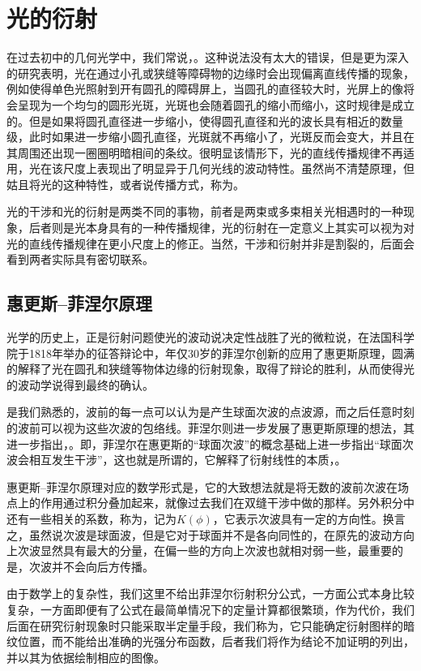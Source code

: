 \section{光的衍射}
在过去初中的几何光学中，我们常说，。这种说法没有太大的错误，但是更为深入的研究表明，光在通过小孔或狭缝等障碍物的边缘时会出现偏离直线传播的现象，例如使得单色光照射到开有圆孔的障碍屏上，当圆孔的直径较大时，光屏上的像将会呈现为一个均匀的圆形光斑，光斑也会随着圆孔的缩小而缩小，这时规律是成立的。但是如果将圆孔直径进一步缩小，使得圆孔直径和光的波长具有相近的数量级，此时如果进一步缩小圆孔直径，光斑就不再缩小了，光斑反而会变大，并且在其周围还出现一圈圈明暗相间的条纹。很明显该情形下，光的直线传播规律不再适用，光在该尺度上表现出了明显异于几何光线的波动特性。虽然尚不清楚原理，但姑且将光的这种特性，或者说传播方式，称为。

光的干涉和光的衍射是两类不同的事物，前者是两束或多束相关光相遇时的一种现象，后者则是光本身具有的一种传播规律，光的衍射在一定意义上其实可以视为对光的直线传播规律在更小尺度上的修正。当然，干涉和衍射并非是割裂的，后面会看到两者实际具有密切联系。

\subsection{惠更斯--菲涅尔原理}
光学的历史上，正是衍射问题使光的波动说决定性战胜了光的微粒说，在法国科学院于1818年举办的征答辩论中，年仅30岁的菲涅尔创新的应用了惠更斯原理，圆满的解释了光在圆孔和狭缝等物体边缘的衍射现象，取得了辩论的胜利，从而使得光的波动学说得到最终的确认。

是我们熟悉的，波前的每一点可以认为是产生球面次波的点波源，而之后任意时刻的波前可以视为这些次波的包络线。菲涅尔则进一步发展了惠更斯原理的想法，其进一步指出，。即，菲涅尔在惠更斯的“球面次波”的概念基础上进一步指出“球面次波会相互发生干涉”，这也就是所谓的，它解释了衍射线性的本质，。

惠更斯--菲涅尔原理对应的数学形式是，它的大致想法就是将无数的波前次波在场点上的作用通过积分叠加起来，就像过去我们在双缝干涉中做的那样。另外积分中还有一些相关的系数，称为，记为$K(\phi)$，它表示次波具有一定的方向性。换言之，虽然说次波是球面波，但是它对于球面并不是各向同性的，在原先的波动方向上次波显然具有最大的分量，在偏一些的方向上次波也就相对弱一些，最重要的是，次波并不会向后方传播。

由于数学上的复杂性，我们这里不给出菲涅尔衍射积分公式，一方面公式本身比较复杂，一方面即便有了公式在最简单情况下的定量计算都很繁琐，作为代价，我们后面在研究衍射现象时只能采取半定量手段，我们称为，它只能确定衍射图样的暗纹位置，而不能给出准确的光强分布函数，后者我们将作为结论不加证明的列出，并以其为依据绘制相应的图像。


